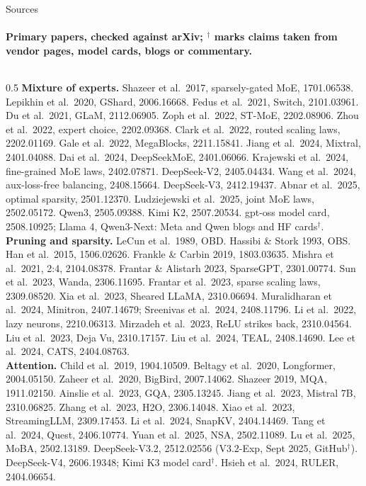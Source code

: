 \documentclass[aspectratio=169,11pt]{beamer}
\begin{document}
\begin{frame}{Sources}
\framesubtitle{Primary papers, checked against arXiv; $^\dagger$ marks claims taken from vendor pages, model cards, blogs or commentary.}
\begin{columns}[T]
\begin{column}{0.5\textwidth}
\fontsize{5.4}{6.4}\selectfont\color{ink}
\textbf{Mixture of experts.} Shazeer et al.\ 2017, sparsely-gated MoE, 1701.06538. Lepikhin et al.\ 2020, GShard, 2006.16668. Fedus et al.\ 2021, Switch, 2101.03961. Du et al.\ 2021, GLaM, 2112.06905. Zoph et al.\ 2022, ST-MoE, 2202.08906. Zhou et al.\ 2022, expert choice, 2202.09368. Clark et al.\ 2022, routed scaling laws, 2202.01169. Gale et al.\ 2022, MegaBlocks, 2211.15841. Jiang et al.\ 2024, Mixtral, 2401.04088. Dai et al.\ 2024, DeepSeekMoE, 2401.06066. Krajewski et al.\ 2024, fine-grained MoE laws, 2402.07871. DeepSeek-V2, 2405.04434. Wang et al.\ 2024, aux-loss-free balancing, 2408.15664. DeepSeek-V3, 2412.19437. Abnar et al.\ 2025, optimal sparsity, 2501.12370. Ludziejewski et al.\ 2025, joint MoE laws, 2502.05172. Qwen3, 2505.09388. Kimi K2, 2507.20534. gpt-oss model card, 2508.10925; Llama 4, Qwen3-Next: Meta and Qwen blogs and HF cards$^\dagger$.\\[2pt]
\textbf{Pruning and sparsity.} LeCun et al.\ 1989, OBD. Hassibi \& Stork 1993, OBS. Han et al.\ 2015, 1506.02626. Frankle \& Carbin 2019, 1803.03635. Mishra et al.\ 2021, 2:4, 2104.08378. Frantar \& Alistarh 2023, SparseGPT, 2301.00774. Sun et al.\ 2023, Wanda, 2306.11695. Frantar et al.\ 2023, sparse scaling laws, 2309.08520. Xia et al.\ 2023, Sheared LLaMA, 2310.06694. Muralidharan et al.\ 2024, Minitron, 2407.14679; Sreenivas et al.\ 2024, 2408.11796. Li et al.\ 2022, lazy neurons, 2210.06313. Mirzadeh et al.\ 2023, ReLU strikes back, 2310.04564. Liu et al.\ 2023, Deja Vu, 2310.17157. Liu et al.\ 2024, TEAL, 2408.14690. Lee et al.\ 2024, CATS, 2404.08763.\\[2pt]
\textbf{Attention.} Child et al.\ 2019, 1904.10509. Beltagy et al.\ 2020, Longformer, 2004.05150. Zaheer et al.\ 2020, BigBird, 2007.14062. Shazeer 2019, MQA, 1911.02150. Ainslie et al.\ 2023, GQA, 2305.13245. Jiang et al.\ 2023, Mistral 7B, 2310.06825. Zhang et al.\ 2023, H2O, 2306.14048. Xiao et al.\ 2023, StreamingLLM, 2309.17453. Li et al.\ 2024, SnapKV, 2404.14469. Tang et al.\ 2024, Quest, 2406.10774. Yuan et al.\ 2025, NSA, 2502.11089. Lu et al.\ 2025, MoBA, 2502.13189. DeepSeek-V3.2, 2512.02556 (V3.2-Exp, Sept 2025, GitHub$^\dagger$). DeepSeek-V4, 2606.19348; Kimi K3 model card$^\dagger$. Hsieh et al.\ 2024, RULER, 2404.06654.

\end{column}
\end{columns}
\end{frame}
\end{document}
